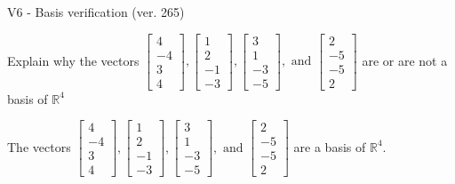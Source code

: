 \begin{exercise}
  \begin{exerciseTitle}V6 - Basis verification (ver. 265)\end{exerciseTitle}
  \begin{exerciseStatement}
    Explain why the vectors \(\left[\begin{array}{r}
4 \\
-4 \\
3 \\
4
\end{array}\right] , \left[\begin{array}{r}
1 \\
2 \\
-1 \\
-3
\end{array}\right] , \left[\begin{array}{r}
3 \\
1 \\
-3 \\
-5
\end{array}\right] , \text{ and } \left[\begin{array}{r}
2 \\
-5 \\
-5 \\
2
\end{array}\right]\) are or are not a basis of \(\mathbb{R}^4\)	


  \end{exerciseStatement}
  \begin{exerciseAnswer}
   The vectors \(\left[\begin{array}{r}
4 \\
-4 \\
3 \\
4
\end{array}\right] , \left[\begin{array}{r}
1 \\
2 \\
-1 \\
-3
\end{array}\right] , \left[\begin{array}{r}
3 \\
1 \\
-3 \\
-5
\end{array}\right] , \text{ and } \left[\begin{array}{r}
2 \\
-5 \\
-5 \\
2
\end{array}\right]\) 
  	 are  a basis of \(\mathbb{R}^4\).
  


  \end{exerciseAnswer}
\end{exercise}